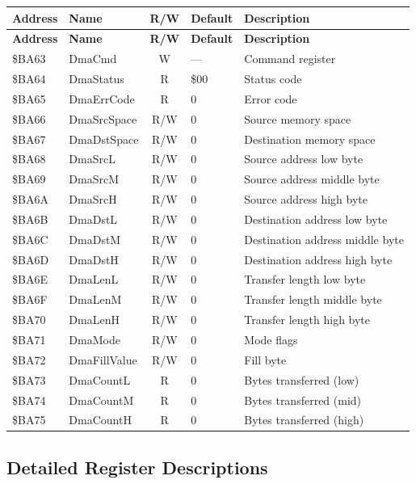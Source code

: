 \begin{center}
\small
\begin{longtable}{@{}llcll@{}}
\toprule
\textbf{Address} & \textbf{Name} & \textbf{R/W} & \textbf{Default} & \textbf{Description} \\
\midrule
\endfirsthead
\toprule
\textbf{Address} & \textbf{Name} & \textbf{R/W} & \textbf{Default} & \textbf{Description} \\
\midrule
\endhead
\$BA63 & DmaCmd       & W   & ---  & Command register \\
\$BA64 & DmaStatus    & R   & \$00 & Status code \\
\$BA65 & DmaErrCode   & R   & 0    & Error code \\
\$BA66 & DmaSrcSpace  & R/W & 0    & Source memory space \\
\$BA67 & DmaDstSpace  & R/W & 0    & Destination memory space \\
\$BA68 & DmaSrcL      & R/W & 0    & Source address low byte \\
\$BA69 & DmaSrcM      & R/W & 0    & Source address middle byte \\
\$BA6A & DmaSrcH      & R/W & 0    & Source address high byte \\
\$BA6B & DmaDstL      & R/W & 0    & Destination address low byte \\
\$BA6C & DmaDstM      & R/W & 0    & Destination address middle byte \\
\$BA6D & DmaDstH      & R/W & 0    & Destination address high byte \\
\$BA6E & DmaLenL      & R/W & 0    & Transfer length low byte \\
\$BA6F & DmaLenM      & R/W & 0    & Transfer length middle byte \\
\$BA70 & DmaLenH      & R/W & 0    & Transfer length high byte \\
\$BA71 & DmaMode      & R/W & 0    & Mode flags \\
\$BA72 & DmaFillValue & R/W & 0    & Fill byte \\
\$BA73 & DmaCountL    & R   & 0    & Bytes transferred (low) \\
\$BA74 & DmaCountM    & R   & 0    & Bytes transferred (mid) \\
\$BA75 & DmaCountH    & R   & 0    & Bytes transferred (high) \\
\bottomrule
\end{longtable}
\end{center}

\subsection{Detailed Register Descriptions}

